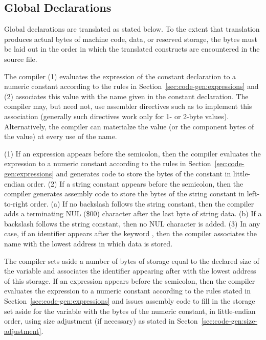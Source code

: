 \documentclass[10pt]{article}
\begin{document}
\subsection{Global Declarations}
\label{sec:code-gen:global-decls}

Global declarations are translated as stated below.  To the extent
that translation produces actual bytes of machine code, data, or
reserved storage, the bytes must be laid out in the order in which the
translated constructs are encountered in the source file.

 The compiler (1) evaluates the
expression of the constant declaration to a numeric constant according
to the rules in Section~\ref{sec:code-gen:expressions} and (2)
associates this value with the name given in the constant declaration.
The compiler may, but need not, use assembler directives such as
 to implement this association (generally such directives
work only for 1- or 2-byte values).  Alternatively, the compiler can
materialze the value (or the component bytes of the value) at every
use of the name.

 (1) If an expression appears before the
semicolon, then the compiler evaluates the expression to a numeric
constant according to the rules in
Section~\ref{sec:code-gen:expressions} and generates code to store the
bytes of the constant in little-endian order.  (2) If a string
constant appears before the semicolon, then the compiler generates
assembly code to store the bytes of the string constant in
left-to-right order.  (a) If no backslash \kwd{\bs} follows the string
constant, then the compiler adds a terminating NUL (\$00) character
after the last byte of string data. (b) If a backslash follows the
string constant, then no NUL character is added.  (3) In any case, if
an identifier appears after the keyword , then the compiler
associates the name with the lowest address in which data is stored.

 The compiler sets aside a
number of bytes of storage equal to the declared size of the variable
and associates the identifier appearing after  with the
lowest address of this storage.  If an expression appears before the
semicolon, then the compiler evaluates the expression to a numeric
constant according to the rules stated in
Section~\ref{sec:code-gen:expressions} and issues assembly code to
fill in the storage set aside for the variable with the bytes of the
numeric constant, in little-endian order, using size adjustment (if
necessary) as stated in Secton~\ref{sec:code-gen:size-adjustment}.
\end{document}
